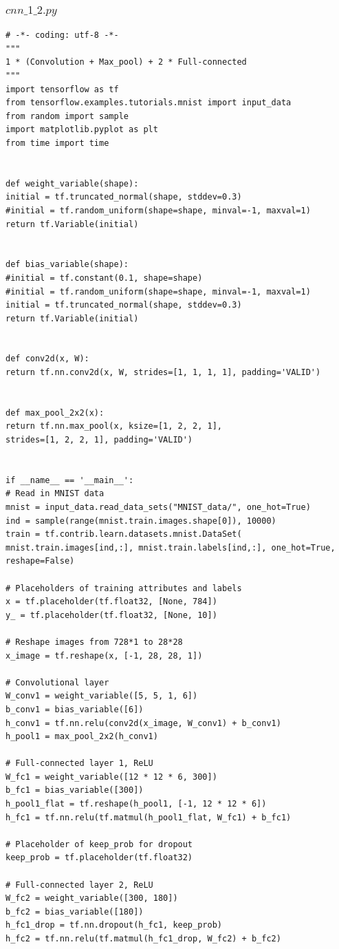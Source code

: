 \documentclass{article}
\begin{document}
\subsubsection{$cnn\_1\_2.py$}
\label{code-2}
\begin{lstlisting}
# -*- coding: utf-8 -*-
"""
1 * (Convolution + Max_pool) + 2 * Full-connected
"""
import tensorflow as tf
from tensorflow.examples.tutorials.mnist import input_data
from random import sample
import matplotlib.pyplot as plt
from time import time


def weight_variable(shape):
initial = tf.truncated_normal(shape, stddev=0.3)
#initial = tf.random_uniform(shape=shape, minval=-1, maxval=1)
return tf.Variable(initial)


def bias_variable(shape):
#initial = tf.constant(0.1, shape=shape)
#initial = tf.random_uniform(shape=shape, minval=-1, maxval=1)
initial = tf.truncated_normal(shape, stddev=0.3)
return tf.Variable(initial)


def conv2d(x, W):
return tf.nn.conv2d(x, W, strides=[1, 1, 1, 1], padding='VALID')


def max_pool_2x2(x):
return tf.nn.max_pool(x, ksize=[1, 2, 2, 1],
strides=[1, 2, 2, 1], padding='VALID')


if __name__ == '__main__':
# Read in MNIST data
mnist = input_data.read_data_sets("MNIST_data/", one_hot=True)
ind = sample(range(mnist.train.images.shape[0]), 10000)
train = tf.contrib.learn.datasets.mnist.DataSet(
mnist.train.images[ind,:], mnist.train.labels[ind,:], one_hot=True, reshape=False)

# Placeholders of training attributes and labels
x = tf.placeholder(tf.float32, [None, 784])
y_ = tf.placeholder(tf.float32, [None, 10])

# Reshape images from 728*1 to 28*28
x_image = tf.reshape(x, [-1, 28, 28, 1])

# Convolutional layer
W_conv1 = weight_variable([5, 5, 1, 6])
b_conv1 = bias_variable([6])
h_conv1 = tf.nn.relu(conv2d(x_image, W_conv1) + b_conv1)
h_pool1 = max_pool_2x2(h_conv1)

# Full-connected layer 1, ReLU
W_fc1 = weight_variable([12 * 12 * 6, 300])
b_fc1 = bias_variable([300])
h_pool1_flat = tf.reshape(h_pool1, [-1, 12 * 12 * 6])
h_fc1 = tf.nn.relu(tf.matmul(h_pool1_flat, W_fc1) + b_fc1)

# Placeholder of keep_prob for dropout
keep_prob = tf.placeholder(tf.float32)

# Full-connected layer 2, ReLU
W_fc2 = weight_variable([300, 180])
b_fc2 = bias_variable([180])
h_fc1_drop = tf.nn.dropout(h_fc1, keep_prob)
h_fc2 = tf.nn.relu(tf.matmul(h_fc1_drop, W_fc2) + b_fc2)


\end{lstlisting}
\end{document}
